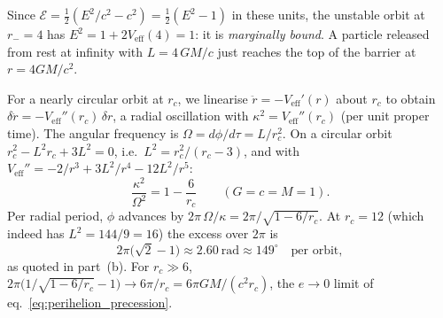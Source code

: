 \begin{annotation}[Why $V_{\mathrm{eff}}(4) = 0$ is special]
Since $\mathcal{E} = \tfrac12(E^2/c^2 - c^2) = \tfrac12(E^2 - 1)$ in these units, the unstable orbit at
$r_- = 4$ has $E^2 = 1 + 2V_{\mathrm{eff}}(4) = 1$: it is \emph{marginally
bound}.  A particle released from rest at infinity with $L = 4\,GM/c$ just
reaches the top of the barrier at $r = 4GM/c^2$.
\end{annotation}

\begin{derivation}[How big is the precession for $L = 4$? (part b, quantitatively)]
For a nearly circular orbit at $r_c$, we linearise $\ddot r = -V_{\mathrm{eff}}'(r)$
about $r_c$ to obtain $\delta\ddot r = -V_{\mathrm{eff}}''(r_c)\,\delta r$, a radial
oscillation with $\kappa^2 = V_{\mathrm{eff}}''(r_c)$ (per unit proper time).
The angular frequency is $\Omega = d\phi/d\tau = L/r_c^2$.  On a circular
orbit $r_c^2 - L^2r_c + 3L^2 = 0$, i.e.\ $L^2 = r_c^2/(r_c - 3)$, and with
$V_{\mathrm{eff}}'' = -2/r^3 + 3L^2/r^4 - 12L^2/r^5$:
\[
\frac{\kappa^2}{\Omega^2} = 1 - \frac{6}{r_c}
\qquad (G = c = M = 1).
\]
Per radial period, $\phi$ advances by $2\pi\,\Omega/\kappa = 2\pi/\sqrt{1 - 6/r_c}$.
At $r_c = 12$ (which indeed has $L^2 = 144/9 = 16$) the excess over $2\pi$ is
\[
2\pi\bigl(\sqrt2 - 1\bigr) \approx 2.60~\text{rad} \approx 149^\circ
\quad\text{per orbit},
\]
as quoted in part~(b).  For
$r_c \gg 6$, $2\pi\bigl(1/\sqrt{1 - 6/r_c} - 1\bigr) \to 6\pi/r_c =
6\pi GM/(c^2r_c)$, the $e \to 0$ limit of eq.~\eqref{eq:perihelion_precession}.
\end{derivation}

